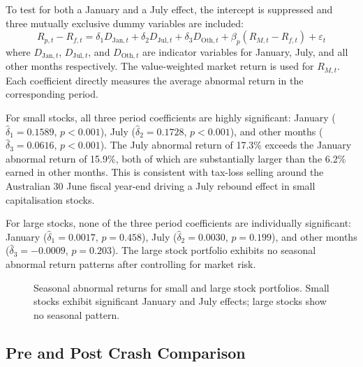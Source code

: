 \documentclass[11pt, a4paper]{article}
\begin{document}
\begin{table}[H]
	\centering
	
	\caption{January and July effect regression for large stocks.}\label{tab:q42_large}
\end{table}

To test for both a January and a July effect, the intercept is suppressed and three mutually exclusive dummy variables are included:
\begin{equation*}
	R_{p,t} - R_{f,t} = \delta_1 D_{\mathrm{Jan},t} + \delta_2 D_{\mathrm{Jul},t} + \delta_3 D_{\mathrm{Oth},t} + \beta_p(R_{M,t} - R_{f,t}) + \varepsilon_t
\end{equation*}
where \(D_{\mathrm{Jan},t}\), \(D_{\mathrm{Jul},t}\), and \(D_{\mathrm{Oth},t}\) are indicator variables for January, July, and all other months respectively. The value-weighted market return is used for \(R_{M,t}\). Each coefficient directly measures the average abnormal return in the corresponding period.

For small stocks, all three period coefficients are highly significant: January (\(\hat{\delta}_1 = 0.1589\), \(p < 0.001\)), July (\(\hat{\delta}_2 = 0.1728\), \(p < 0.001\)), and other months (\(\hat{\delta}_3 = 0.0616\), \(p < 0.001\)). The July abnormal return of 17.3\% exceeds the January abnormal return of 15.9\%, both of which are substantially larger than the 6.2\% earned in other months. This is consistent with tax-loss selling around the Australian 30 June fiscal year-end driving a July rebound effect in small capitalisation stocks.

For large stocks, none of the three period coefficients are individually significant: January (\(\hat{\delta}_1 = 0.0017\), \(p = 0.458\)), July (\(\hat{\delta}_2 = 0.0030\), \(p = 0.199\)), and other months (\(\hat{\delta}_3 = -0.0009\), \(p = 0.203\)). The large stock portfolio exhibits no seasonal abnormal return patterns after controlling for market risk.

\begin{figure}[H]
	\centering
	
	\caption{Seasonal abnormal returns for small and large stock portfolios. Small stocks exhibit significant January and July effects; large stocks show no seasonal pattern.}\label{fig:q4_seasonal}
\end{figure}

\subsection{Pre and Post Crash Comparison}
\end{document}
